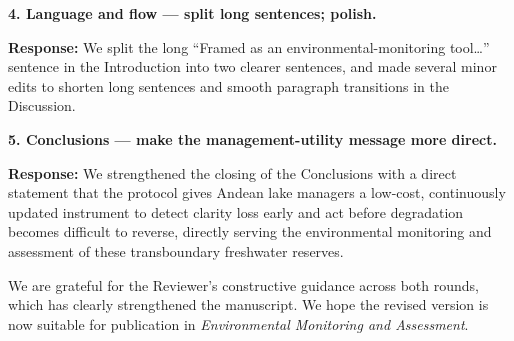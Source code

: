 \documentclass[11pt]{article}
\newcommand{\resp}[1]{\par\noindent\textcolor{blue!60!black}{\textbf{Response:}} #1\par\medskip}
\begin{document}
\textbf{4. Language and flow --- split long sentences; polish.}
\resp{We split the long ``Framed as an environmental-monitoring tool\ldots''
sentence in the Introduction into two clearer sentences, and made several minor
edits to shorten long sentences and smooth paragraph transitions in the Discussion.}

\textbf{5. Conclusions --- make the management-utility message more direct.}
\resp{We strengthened the closing of the Conclusions with a direct statement that
the protocol gives Andean lake managers a low-cost, continuously updated instrument
to detect clarity loss early and act before degradation becomes difficult to
reverse, directly serving the environmental monitoring and assessment of these
transboundary freshwater reserves.}

\hrulefill

We are grateful for the Reviewer's constructive guidance across both rounds, which
has clearly strengthened the manuscript. We hope the revised version is now suitable
for publication in \textit{Environmental Monitoring and Assessment}.
\end{document}
